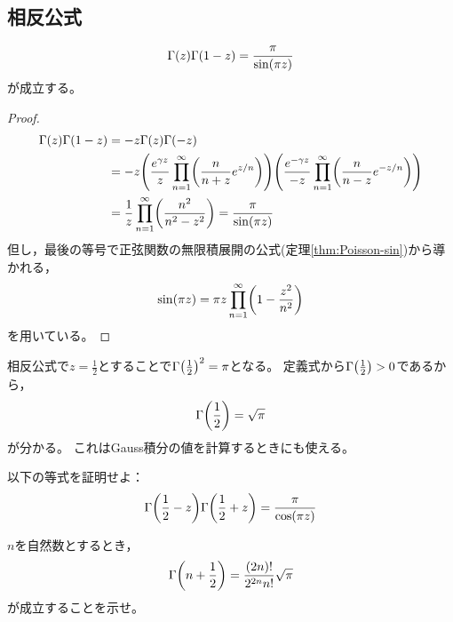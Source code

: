 \documentclass[a4paper,draft]{ltjsarticle}
\begin{document}
\subsection{相反公式}
\begin{thm}[Gamma関数の相反公式]\label{thm:Gamma-相反公式}
    \begin{equation}
        \fun{\Gamma}{z}\fun{\Gamma}{1-z}=\dfrac{\pi}{\fun{\sin}{\pi z}}
    \end{equation}
    が成立する。
    \begin{proof}
        \begin{align}
            \fun{\Gamma}{z}\fun{\Gamma}{1-z}
            & = -z\fun{\Gamma}{z}\fun{\Gamma}{-z}
            \\
            & = -z\pare{\dfrac{e^{\gamma z}}{z}\prod_{n=1}^\infty\pare{\dfrac{n}{n+z}e^{z/n}}}\pare{\dfrac{e^{-\gamma z}}{-z}\prod_{n=1}^\infty\pare{\dfrac{n}{n-z}e^{-z/n}}}
            \\
            & = \dfrac{1}{z}\prod_{n=1}^\infty\pare{\dfrac{n^2}{n^2-z^2}}
            = \dfrac{\pi}{\fun{\sin}{\pi z}}
        \end{align}
        但し，最後の等号で正弦関数の無限積展開の公式(定理\ref{thm:Poisson-sin})から導かれる，
        \begin{equation}
            \fun{\sin}{\pi z}=\pi z\prod_{n=1}^\infty \pare{1-\dfrac{z^2}{n^2}}
        \end{equation}
        を用いている。
    \end{proof}
\end{thm}

相反公式で$z=\frac{1}{2}$とすることで$\fun{\Gamma}{\frac{1}{2}}^2=\pi$となる。
定義式から$\fun{\Gamma}{\frac{1}{2}}>0$であるから，
\begin{equation}
    \fun{\Gamma}{\dfrac{1}{2}}=\sqrt{\pi}
    \label{eq:gamma-Gamma(1/2)}
\end{equation}
が分かる。
これはGauss積分の値を計算するときにも使える。

\begin{prob}\label{prob-gamma:相反公式-cos}
    以下の等式を証明せよ：
    \begin{equation}
        \fun{\Gamma}{\frac{1}{2}-z}\fun{\Gamma}{\frac{1}{2}+z}=\frac{\pi}{\fun{\cos}{\pi z}}
    \end{equation}
\end{prob}

\begin{prob}\label{prob-gamma:半整数におけるGamma関数の値}
    $n$を自然数とするとき，
    \begin{equation}
        \fun{\Gamma}{n+\frac{1}{2}}=\frac{\pare{2n}!}{2^{2n}n!}\sqrt{\pi}
    \end{equation}
    が成立することを示せ。
\end{prob}
\end{document}
